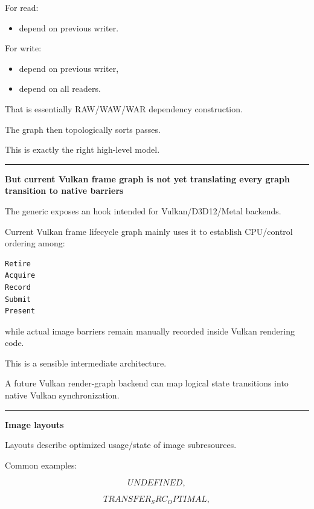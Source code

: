 For read:

\begin{itemize}
\tightlist
\item
  depend on previous writer.
\end{itemize}

For write:

\begin{itemize}
\tightlist
\item
  depend on previous writer,
\item
  depend on all readers.
\end{itemize}

That is essentially RAW/WAW/WAR dependency construction.

The graph then topologically sorts passes.

This is exactly the right high-level model.

\begin{center}\rule{0.5\linewidth}{0.5pt}\end{center}

\textbf{But current Vulkan frame graph is not yet translating every graph transition to native barriers}

The generic  exposes an  hook intended for Vulkan/D3D12/Metal backends.

Current Vulkan frame lifecycle graph mainly uses it to establish CPU/control ordering among:

\begin{verbatim}
Retire
Acquire
Record
Submit
Present
\end{verbatim}

while actual image barriers remain manually recorded inside Vulkan rendering code.

This is a sensible intermediate architecture.

A future Vulkan render-graph backend can map logical state transitions into native Vulkan synchronization.

\begin{center}\rule{0.5\linewidth}{0.5pt}\end{center}

\textbf{Image layouts}

Layouts describe optimized usage/state of image subresources.

Common examples:

\[
UNDEFINED,
\]

\[
TRANSFER_SRC_OPTIMAL,
\]

